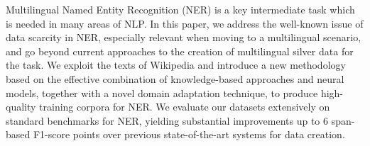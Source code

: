 Multilingual Named Entity Recognition (NER) is a key intermediate task which is needed in many areas of NLP. In this paper, we address the well-known issue of data scarcity in NER, especially relevant when moving to a multilingual scenario, and go beyond current approaches to the creation of multilingual silver data for the task. We exploit the texts of Wikipedia and introduce a new methodology based on the effective combination of knowledge-based approaches and neural models, together with a novel domain adaptation technique, to produce high-quality training corpora for NER. We evaluate our datasets extensively on standard benchmarks for NER, yielding substantial improvements up to 6 span-based F1-score points over previous state-of-the-art systems for data creation.
